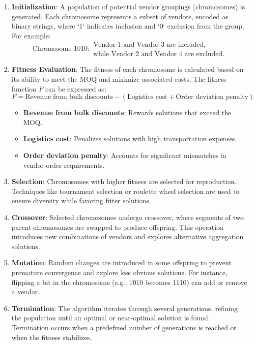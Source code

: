 \begin{enumerate}
    \item \textbf{Initialization}: A population of potential vendor groupings (chromosomes) is generated. Each chromosome represents a subset of vendors, encoded as binary strings, where `1` indicates inclusion and `0` exclusion from the group. For example:
          \[
              \text{Chromosome } 1010: \begin{array}{l}
                  \text{Vendor 1 and Vendor 3 are included,} \\
                  \text{while Vendor 2 and Vendor 4 are excluded.}
              \end{array}
          \]
    \item \textbf{Fitness Evaluation}: The fitness of each chromosome is calculated based on its ability to meet the MOQ and minimize associated costs. The fitness function \(F\) can be expressed as:
          \[
              F = \text{Revenue from bulk discounts} - \left( \text{Logistics cost} + \text{Order deviation penalty} \right)
          \]

          \begin{itemize}
              \item \textbf{Revenue from bulk discounts}: Rewards solutions that exceed the MOQ.
              \item \textbf{Logistics cost}: Penalizes solutions with high transportation expenses.
              \item \textbf{Order deviation penalty}: Accounts for significant mismatches in vendor order requirements.
          \end{itemize}

    \item \textbf{Selection}: Chromosomes with higher fitness are selected for reproduction. Techniques like tournament selection or roulette wheel selection are used to ensure diversity while favoring fitter solutions.

    \item \textbf{Crossover}: Selected chromosomes undergo crossover, where segments of two parent chromosomes are swapped to produce offspring. This operation introduces new combinations of vendors and explores alternative aggregation solutions.

    \item \textbf{Mutation}: Random changes are introduced in some offspring to prevent premature convergence and explore less obvious solutions. For instance, flipping a bit in the chromosome (e.g., 1010 becomes 1110) can add or remove a vendor.

    \item \textbf{Termination}: The algorithm iterates through several generations, refining the population until an optimal or near-optimal solution is found. Termination occurs when a predefined number of generations is reached or when the fitness stabilizes.
\end{enumerate}

